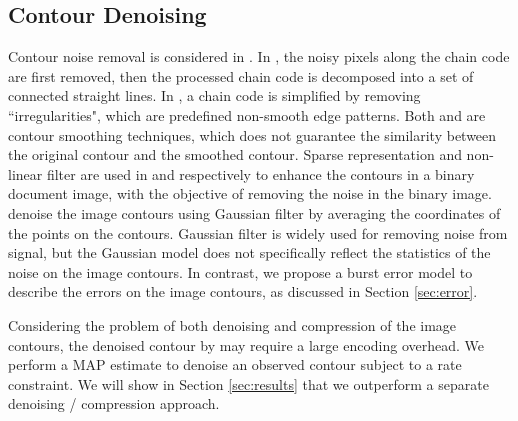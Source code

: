 \subsection{Contour Denoising}
\label{subsec:related_contour_denoising}
Contour noise removal is considered in \cite{yu1997efficient,daribo14,hoang2011edge,reisert2008equivariant,lu2015rapid,zhong2010convergence}.
In \cite{yu1997efficient}, the noisy pixels along the chain code are first removed, then the processed chain code is decomposed into a set of connected straight lines.
In \cite{daribo14}, a chain code is simplified by removing ``irregularities", which are predefined non-smooth edge patterns.
Both \cite{yu1997efficient} and \cite{daribo14} are contour smoothing techniques, which does not guarantee the similarity between the original contour and the smoothed contour.
Sparse representation and non-linear filter are used in \cite{hoang2011edge} and \cite{reisert2008equivariant} respectively to enhance the contours in a binary document image, with the objective of removing the noise in the binary image.
\cite{lu2015rapid,zhong2010convergence} denoise the image contours using Gaussian filter by averaging the coordinates of the points on the contours.
Gaussian filter is widely used for removing noise from signal, but the Gaussian model does not specifically reflect the statistics of the noise on the image contours.
In contrast, we propose a burst error model to describe the errors on the image contours, as discussed in Section \ref{sec:error}.

Considering the problem of both denoising and compression of the image contours, the denoised contour by \cite{yu1997efficient,daribo14,hoang2011edge,reisert2008equivariant,lu2015rapid,zhong2010convergence} may require a large encoding overhead.
We perform a MAP estimate to denoise an observed contour subject to a rate constraint. We will show in Section \ref{sec:results} that we outperform a separate denoising / compression approach.